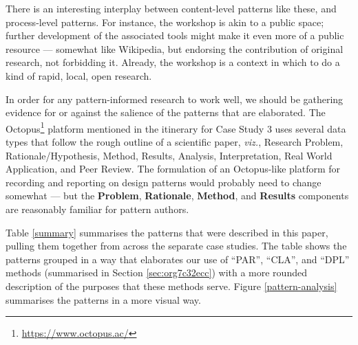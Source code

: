\documentclass[acmlarge,timestamp]{acmart}
\begin{document}
There is an interesting interplay between content-level patterns like
these, and process-level patterns.  For instance, the workshop is akin
to a public space; further development of the associated tools might
make it even more of a public resource — somewhat like Wikipedia, but endorsing the contribution of original research, not forbidding it.  Already, the workshop is a context in which to do a kind of rapid, local, open research.

In order for any pattern-informed research to work well, we should be gathering evidence for or against the salience of the patterns that are elaborated.  The Octopus\footnote{\url{https://www.octopus.ac/}} platform mentioned in the itinerary for Case Study 3 uses several data types that follow the rough outline of a scientific paper, \emph{viz.},
Research Problem,
Rationale/Hypothesis,
Method,
Results,
Analysis,
Interpretation,
Real World Application, and
Peer Review.
The formulation of an Octopus-like platform for recording and reporting on design patterns would probably need to change somewhat — but the \textbf{Problem}, \textbf{Rationale}, \textbf{Method}, and \textbf{Results} components are reasonably familiar for pattern authors.

Table \ref{summary} summarises the patterns that were described in
this paper, pulling them together from across the separate case
studies.  The table shows the patterns grouped in a way that
elaborates our use of “PAR”, “CLA”, and “DPL” methods (summarised in
Section \ref{sec:org7c32ecc}) with a more rounded description of the
purposes that these methods serve.  Figure \ref{pattern-analysis}
summarises the patterns in a more visual way.
\end{document}
